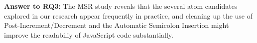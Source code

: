 \begin{mh}
  {\bf Answer to RQ3:} The MSR study reveals that
  the several atom candidates explored in our research
  appear frequently in practice, and cleaning up the use of 
  Post-Increment/Decrement and the Automatic Semicolon Insertion
  might improve the readabiliy of JavaScript code substantially. 
\end{mh}






